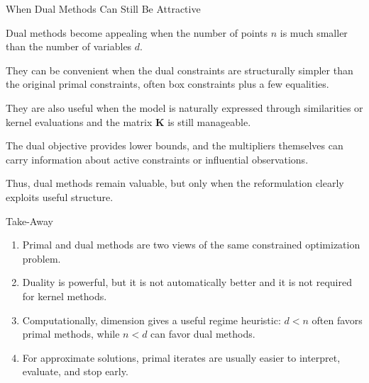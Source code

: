 \documentclass[11pt,compress,t,notes=noshow, xcolor=table]{beamer}
\begin{document}
\begin{framei}[fs=small]{When Dual Methods Can Still Be Attractive}
\item Dual methods become appealing when the number of points $n$ is much smaller than the number of variables $d$.
\item They can be convenient when the dual constraints are structurally simpler than the original primal constraints, often box constraints plus a few equalities.
\item They are also useful when the model is naturally expressed through similarities or kernel evaluations and the matrix $\mathbf{K}$ is still manageable.
\item The dual objective provides lower bounds, and the multipliers themselves can carry information about active constraints or influential observations.
\item Thus, dual methods remain valuable, but only when the reformulation clearly exploits useful structure.
\end{framei}


\begin{framev}{Take-Away}
\begin{enumerate}
\item Primal and dual methods are two views of the same constrained optimization problem.
\item Duality is powerful, but it is not automatically better and it is not required for kernel methods.
\item Computationally, dimension gives a useful regime heuristic: $d < n$ often favors primal methods, while $n < d$ can favor dual methods.
\item For approximate solutions, primal iterates are usually easier to interpret, evaluate, and stop early.
\end{enumerate}
\vfill
{}
\end{framev}

\endlecture
\end{document}
